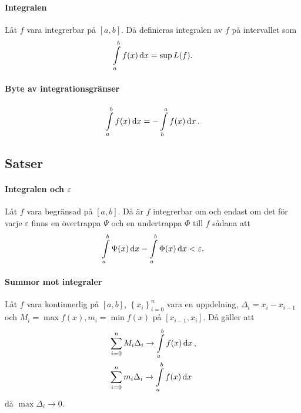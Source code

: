 \paragraph{Integralen}
Låt $f$ vara integrerbar på $[a, b]$. Då definieras integralen av $f$ på intervallet som
\begin{align*}
	\int\limits_{a}^{b}f(x)\dd{x} = \sup{L(f)}.
\end{align*}

\paragraph{Byte av integrationsgränser}
\begin{align*}
	\int\limits_{a}^{b}f(x)\dd{x} = -\int\limits_{b}^{a}f(x)\dd{x}.
\end{align*}

\subsection{Satser}

\paragraph{Integralen och $\varepsilon$}
Låt $f$ vara begränsad på $[a, b]$. Då är $f$ integrerbar om och endast om det för varje $\varepsilon$ finns en övertrappa $\Psi$ och en undertrappa $\Phi$ till $f$ sådana att
\begin{align*}
	\int\limits_{a}^{b}\Psi(x)\dd{x} - \int\limits_{a}^{b}\Phi(x)\dd{x} < \varepsilon.
\end{align*}

\proof

\paragraph{Summor mot integraler}
Låt $f$ vara kontinuerlig på $[a, b]$, $\left\{x_i\right\}_{i = 0}^n$ vara en uppdelning, $\Delta_i = x_i - x_{i - 1}$ och $M_i = \max{f(x)}, m_i = \min{f(x)}$ på $[x_{i - 1}, x_i]$. Då gäller att
\begin{align*}
	&\sum\limits_{i = 0}^n M_i\Delta_i\to\int\limits_{a}^{b}f(x)\dd{x}, \\
	&\sum\limits_{i = 0}^n m_i\Delta_i\to\int\limits_{a}^{b}f(x)\dd{x}
\end{align*}
då $\max{\Delta_i}\to 0$.

\proof

